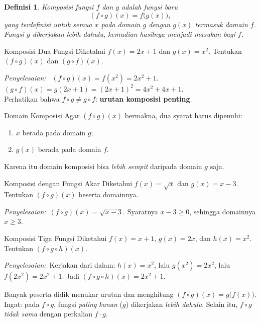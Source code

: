 \documentclass[11pt,a4paper]{report}
\theoremstyle{gaya}
\newtheorem{definisi}{Definisi}[chapter]
\newcommand{\jawab}{\par\smallskip\noindent\textit{\textcolor{oranye}{Penyelesaian:}}\ }
\begin{document}
\begin{definisi}
\emph{Komposisi fungsi} $f$ dan $g$ adalah fungsi baru
\[
(f \circ g)(x) = f\big(g(x)\big),
\]
yang terdefinisi untuk semua $x$ pada domain $g$ dengan $g(x)$ termasuk domain $f$. Fungsi $g$ dikerjakan lebih dahulu, kemudian hasilnya menjadi masukan bagi $f$.
\end{definisi}

\begin{contoh}{Komposisi Dua Fungsi}
Diketahui $f(x) = 2x + 1$ dan $g(x) = x^2$. Tentukan $(f\circ g)(x)$ dan $(g\circ f)(x)$.

\jawab
$(f\circ g)(x) = f(x^2) = 2x^2 + 1.$\\
$(g\circ f)(x) = g(2x+1) = (2x+1)^2 = 4x^2 + 4x + 1.$\\
Perhatikan bahwa $f\circ g \neq g\circ f$: \textbf{urutan komposisi penting}.
\end{contoh}

\begin{konsep}{Domain Komposisi}
Agar $(f\circ g)(x)$ bermakna, dua syarat harus dipenuhi:
\begin{enumerate}[leftmargin=*,topsep=2pt,label=(\arabic*)]
  \item $x$ berada pada domain $g$;
  \item $g(x)$ berada pada domain $f$.
\end{enumerate}
Karena itu domain komposisi bisa \emph{lebih sempit} daripada domain $g$ saja.
\end{konsep}

\begin{contoh}{Komposisi dengan Fungsi Akar}
Diketahui $f(x)=\sqrt{x}$ dan $g(x)=x-3$. Tentukan $(f\circ g)(x)$ beserta domainnya.

\jawab $(f\circ g)(x)=\sqrt{x-3}$. Syaratnya $x-3\ge 0$, sehingga domainnya $x\ge 3$.
\end{contoh}

\begin{contoh}{Komposisi Tiga Fungsi}
Diketahui $f(x)=x+1$, $g(x)=2x$, dan $h(x)=x^2$. Tentukan $(f\circ g\circ h)(x)$.

\jawab Kerjakan dari dalam: $h(x)=x^2$, lalu $g(x^2)=2x^2$, lalu $f(2x^2)=2x^2+1$.
Jadi $(f\circ g\circ h)(x)=2x^2+1$.
\end{contoh}

\begin{kesalahan}
Banyak peserta didik menukar urutan dan menghitung $(f\circ g)(x)=g\big(f(x)\big)$. Ingat: pada $f\circ g$, fungsi \emph{paling kanan} ($g$) dikerjakan \emph{lebih dahulu}. Selain itu, $f\circ g$ \emph{tidak sama} dengan perkalian $f\cdot g$.
\end{kesalahan}
\end{document}
